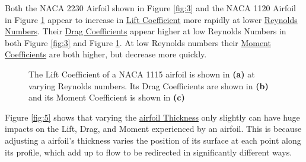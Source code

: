 \documentclass{article}
\begin{document}
Both the NACA 2230 Airfoil shown in Figure \ref{fig:3} and the NACA 1120 Airfoil in Figure \ref{fig:4} appear to increase in \hyperlink{CL}{Lift Coefficient} more rapidly at lower \hyperlink{Re}{Reynolds Numbers}. Their \hyperlink{CD}{Drag Coefficients} appear higher at low Reynolds Numbers in both Figure \ref{fig:3} and Figure \ref{fig:4}. At low Reynolds numbers their \hyperlink{CM}{Moment Coefficients} are both higher, but decrease more quickly.

\begin{figure}[!htb]
  \centering
  \caption{The Lift Coefficient of a NACA 1115 airfoil is shown in \textbf{(a)} at varying Reynolds numbers. Its Drag Coefficients are shown in \textbf{(b)} and its Moment Coefficient is shown in \textbf{(c)}}
  \label{fig:4}
\end{figure}

Figure \ref{fig:5} shows that varying the \hyperlink{Th}{airfoil Thickness} only slightly can have huge impacts on the Lift, Drag, and Moment experienced by an airfoil. This is because adjusting a airfoil's thickness varies the position of its surface at each point along its profile, which add up to flow to be redirected in significantly different ways.
\end{document}
